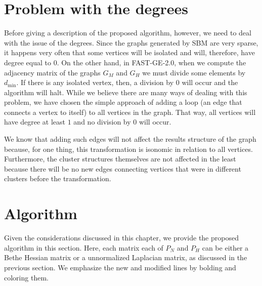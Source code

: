 \section{Problem with the degrees}
Before giving a description of the proposed algorithm, however, we need to deal with the issue of the degrees.
Since the graphs generated by SBM are very sparse, it happens very often that some vertices will be isolated and will, therefore, have degree equal to $0$.
On the other hand, in FAST-GE-2.0, when we compute the adjacency matrix of the graphs $G_M$ and $G_H$ we must divide some elements by $d_\text{min}$.
If there is any isolated vertex, then, a division by $0$ will occur and the algorithm will halt.
While we believe there are many ways of dealing with this problem, we have chosen the simple approach of adding a loop (an edge that connects a vertex to itself) to all vertices in the graph.
That way, all vertices will have degree at least $1$ and no division by $0$ will occur.

We know that adding such edges will not affect the results structure of the graph because, for one thing, this transformation is isonomic in relation to all vertices.
Furthermore, the cluster structures themselves are not affected in the least because there will be no new edges connecting vertices that were in different clusters before the transformation.

\section{Algorithm}
Given the considerations discussed in this chapter, we provide the proposed algorithm in this section.
Here, each matrix each of $P_N$ and $P_H$ can be either a Bethe Hessian matrix or a unnormalized Laplacian matrix, as discussed in the previous section.
We emphasize the new and modified lines by bolding and coloring them.

